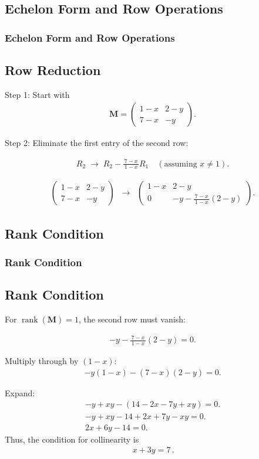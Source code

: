 \documentclass{beamer}
\theoremstyle{remark}
\newcommand{\myvec}[1]{\ensuremath{\begin{pmatrix}#1\end{pmatrix}}}
\let\vec\mathbf
\numberwithin{equation}{section}
\begin{document}
\subsection{Echelon Form and Row Operations}
\begin{frame}
\frametitle{Echelon Form and Row Operations}
\subsection*{Row Reduction}

Step 1: Start with
\begin{align}
\vec{M} = \myvec
{1-x & 2-y \\
7-x & -y}.
\end{align}

Step 2: Eliminate the first entry of the second row:

\begin{align}
R_2 \;\longrightarrow\; R_2 - \frac{7-x}{\,1-x\,}R_1 \quad (\text{assuming } x\neq 1).
\end{align}

\begin{align}
\myvec
{1-x & 2-y \\
7-x & -y}
\;\;\longrightarrow\;\;
\myvec
{1-x & 2-y \\
0 & -y - \frac{7-x}{\,1-x\,}(2-y)}.
\end{align}

\end{frame}
\subsection{Rank Condition}
\begin{frame}
\frametitle{Rank Condition}
\subsection*{Rank Condition}

For $\operatorname{rank}(\vec{M})=1$, the second row must vanish:

\begin{align}
-y - \frac{7-x}{\,1-x\,}(2-y) = 0.
\end{align}

Multiply through by $(1-x)$:
\begin{align}
-y(1-x) - (7-x)(2-y) = 0.
\end{align}

Expand:
\begin{align}
- y + xy - (14 - 2x - 7y + xy) = 0.  \\
- y + xy - 14 + 2x + 7y - xy = 0.  \\
2x + 6y - 14 = 0.
\end{align}
Thus, the condition for collinearity is
\begin{align}
\boxed{\,x + 3y = 7\,}.
\end{align}
\end{frame}
\end{document}
